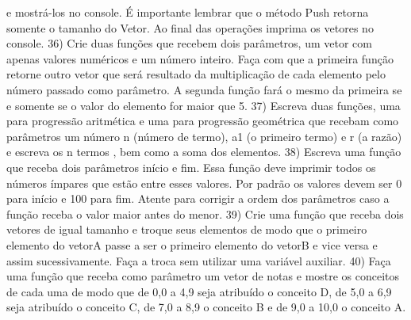 e mostrá-los no console. É importante lembrar que o método Push retorna somente o tamanho do Vetor. Ao
final das operações imprima os vetores no console.
36) Crie duas funções que recebem dois parâmetros, um vetor com apenas valores numéricos e um número
inteiro. Faça com que a primeira função retorne outro vetor que será resultado da multiplicação de cada
elemento pelo número passado como parâmetro. A segunda função fará o mesmo da primeira se e somente se
o valor do elemento for maior que 5.
37) Escreva duas funções, uma para progressão aritmética e uma para progressão geométrica que recebam
como parâmetros um número n (número de termo), a1 (o primeiro termo) e r (a razão) e escreva os n termos ,
bem como a soma dos elementos.
38) Escreva uma função que receba dois parâmetros início e fim. Essa função deve imprimir todos os números
ímpares que estão entre esses valores. Por padrão os valores devem ser 0 para início e 100 para fim. Atente
para corrigir a ordem dos parâmetros caso a função receba o valor maior antes do menor.
39) Crie uma função que receba dois vetores de igual tamanho e troque seus elementos de modo que o
primeiro elemento do vetorA passe a ser o primeiro elemento do vetorB e vice versa e assim sucessivamente.
Faça a troca sem utilizar uma variável auxiliar.
40) Faça uma função que receba como parâmetro um vetor de notas e mostre os conceitos de cada uma de
modo que de 0,0 a 4,9 seja atribuído o conceito D, de 5,0 a 6,9 seja atribuído o conceito C, de 7,0 a 8,9 o
conceito B e de 9,0 a 10,0 o conceito A.